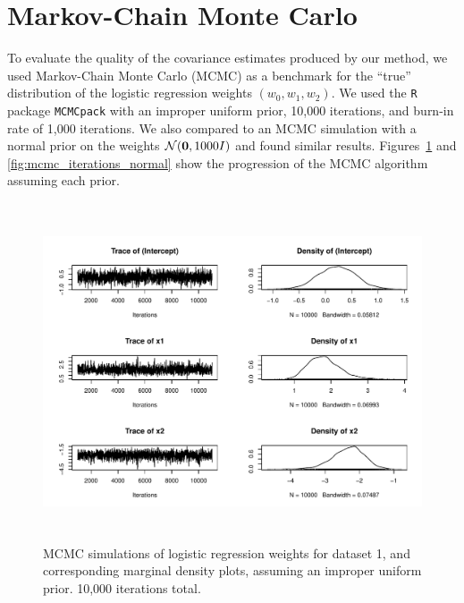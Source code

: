 
\section{Markov-Chain Monte Carlo}\label{sec:mcmc}

To evaluate the quality of the covariance estimates produced by our method, we used Markov-Chain Monte Carlo (MCMC) as a benchmark for the ``true'' distribution of the logistic regression weights $(w_0, w_1, w_2)$.  We used the \texttt{R} package \texttt{MCMCpack} with an improper uniform prior, 10,000 iterations, and burn-in rate of 1,000 iterations.  We also compared to
an MCMC simulation with a normal prior on the weights $\mathcal{N}(\boldsymbol{\mathbf{0}},1000I)$ and found similar results. Figures~\ref{fig:mcmc_iterations} and \ref{fig:mcmc_iterations_normal} show the progression of the MCMC algorithm assuming each prior.  

\begin{figure}
\centering
	\includegraphics[height=100mm]{figures/mcmc_uniform.pdf}
    \caption{MCMC simulations of logistic regression weights for dataset 1, and corresponding marginal density plots, assuming 
    an improper uniform prior. 10,000 iterations total.}  \label{fig:mcmc_iterations}  
\end{figure}

